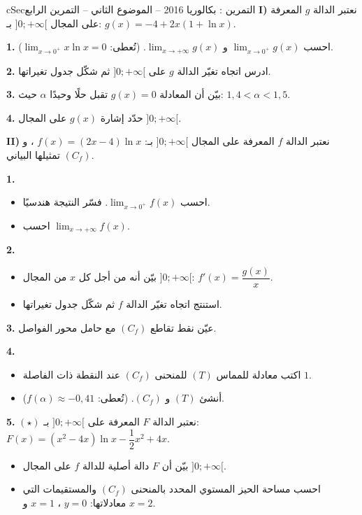 \documentclass[12pt,a4paper]{article}
\newenvironment{BOX}[2]{\begin{otherlanguage}{english}\begin{arbox}{#1}{#2}}{\end{arbox}\end{otherlanguage}}
\newcounter{exo}
\newenvironment{tamrin}[1]{\stepcounter{exo}\begin{BOX}{cSec}{التمرين \theexo: #1}}{\end{BOX}}
\newenvironment{sq}{\begin{itemize}[leftmargin=2.4em,itemsep=3pt]}{\end{itemize}}
\newcommand{\qa}{\item[(أ)]}\newcommand{\qb}{\item[(ب)]}\newcommand{\qc}{\item[(جـ)]}\newcommand{\qd}{\item[(د)]}\newcommand{\qe}{\item[(هـ)]}
\newcommand{\QQ}[1]{\par\smallskip\textbf{#1.} }
\newcommand{\Lm}[1]{\displaystyle\lim_{x\to#1}}
\begin{document}
\begin{tamrin}{بكالوريا 2016 -- الموضوع الثاني -- التمرين الرابع}
\textbf{I)} نعتبر الدالة $g$ المعرفة على المجال $]0;+\infty[$ بـ: $g(x)=-4+2x(1+\ln x)$.
\QQ{1} احسب $\Lm{0^+}g(x)$ و $\Lm{+\infty}g(x)$. (تُعطى: $\Lm{0^+}x\ln x=0$).
\QQ{2} ادرس اتجاه تغيّر الدالة $g$ على $]0;+\infty[$ ثم شكّل جدول تغيراتها.
\QQ{3} بيّن أن المعادلة $g(x)=0$ تقبل حلًا وحيدًا $\alpha$ حيث: $1{,}4<\alpha<1{,}5$.
\QQ{4} حدّد إشارة $g(x)$ على المجال $]0;+\infty[$.\par
\textbf{II)} نعتبر الدالة $f$ المعرفة على المجال $]0;+\infty[$ بـ: $f(x)=(2x-4)\ln x$ ، و $(C_f)$ تمثيلها البياني.
\QQ{1}
\begin{sq}
\qa احسب $\Lm{0^+}f(x)$. فسّر النتيجة هندسيًا.
\qb احسب $\Lm{+\infty}f(x)$.
\end{sq}
\QQ{2}
\begin{sq}
\qa بيّن أنه من أجل كل $x$ من المجال $]0;+\infty[$: $f'(x)=\dfrac{g(x)}x$.
\qb استنتج اتجاه تغيّر الدالة $f$ ثم شكّل جدول تغيراتها.
\end{sq}
\QQ{3} عيّن نقط تقاطع $(C_f)$ مع حامل محور الفواصل.
\QQ{4}
\begin{sq}
\qa اكتب معادلة للمماس $(T)$ للمنحنى $(C_f)$ عند النقطة ذات الفاصلة $1$.
\qb أنشئ $(T)$ و $(C_f)$. (تُعطى: $f(\alpha)\approx-0{,}41$).
\end{sq}
\QQ{5} $(\star)$ نعتبر الدالة $F$ المعرفة على $]0;+\infty[$ بـ: $F(x)=\left(x^2-4x\right)\ln x-\dfrac12x^2+4x$.
\begin{sq}
\qa بيّن أن $F$ دالة أصلية للدالة $f$ على المجال $]0;+\infty[$.
\qb احسب مساحة الحيز المستوي المحدد بالمنحنى $(C_f)$ والمستقيمات التي معادلاتها: $y=0$ ، $x=1$ و $x=2$.
\end{sq}
\end{tamrin}
\end{document}
